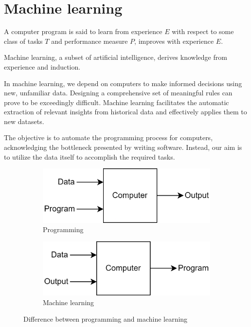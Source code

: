 \section{Machine learning}

\begin{definition}
    A computer program is said to learn from experience $E$ with respect to some class of tasks $T$ and performance measure $P$, improves with experience $E$. 
\end{definition}

Machine learning, a subset of artificial intelligence, derives knowledge from experience and induction.

In machine learning, we depend on computers to make informed decisions using new, unfamiliar data. 
Designing a comprehensive set of meaningful rules can prove to be exceedingly difficult. 
Machine learning facilitates the automatic extraction of relevant insights from historical data and effectively applies them to new datasets.

The objective is to automate the programming process for computers, acknowledging the bottleneck presented by writing software.
Instead, our aim is to utilize the data itself to accomplish the required tasks.

\begin{figure}[H]
    \centering
    \begin{subfigure}{0.49\textwidth}
        \centering
        \includegraphics[width=0.9\linewidth]{images/program.png} 
        \caption{Programming}
    \end{subfigure}
    \begin{subfigure}{0.49\textwidth}
        \centering
        \includegraphics[width=0.9\linewidth]{images/learning.png}
        \caption{Machine learning}
    \end{subfigure}
    \caption{Difference between programming and machine learning}
\end{figure}

